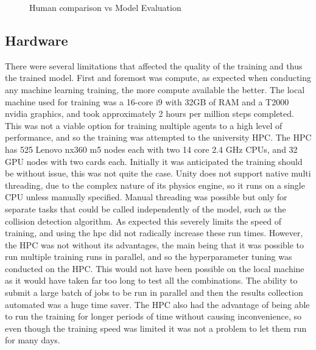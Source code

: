 \begin{figure}
    \centering
    \caption{Human comparison vs Model Evaluation}\label{human_comparison}
\end{figure}

\subsection{Hardware}\label{sec:hardware_evaluation}
There were several limitations that affected the quality of the training and thus the trained model. First and foremost was compute, as expected when conducting any machine learning training, the more compute available the better. The local machine used for training was a 16-core i9 with 32GB of RAM and a T2000 nvidia graphics, and took approximately 2 hours per million steps completed. This was not a viable option for training multiple agents to a high level of performance, and so the training was attempted to the university HPC. The HPC has 525 Lenovo nx360 m5 nodes each with two 14 core 2.4 GHz CPUs, and 32 GPU nodes with two cards each. Initially it was anticipated the training should be without issue, this was not quite the case. Unity does not support native multi threading, due to the complex nature of its physics engine, so it runs on a single CPU unless manually specified. Manual threading was possible but only for separate tasks that could be called independently of the model, such as the collision detection algorithm. As expected this severely limits the speed of training, and using the hpc did not radically increase these run times.
However, the HPC was not without its advantages, the main being that it was possible to run multiple training runs in parallel, and so the hyperparameter tuning was conducted on the HPC. This would not have been possible on the local machine as it would have taken far too long to test all the combinations. The ability to submit a large batch of jobs to be run in parallel and then the results collection automated was a huge time saver. The HPC also had the advantage of being able to run the training for longer periods of time without causing inconvenience, so even though the training speed was limited it was not a problem to let them run for many days. 

